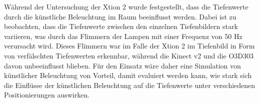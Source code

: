\documentclass[thesis.tex]{subfiles}
\begin{document}
Während der Untersuchung der Xtion 2 wurde festgestellt, dass die Tiefenwerte durch die künstliche Beleuchtung im Raum beeinflusst werden. Dabei ist zu beobachten, dass die Tiefenwerte zwischen den einzelnen Tiefenbildern stark variieren, was durch das Flimmern der Lampen mit einer Frequenz von 50 Hz verursacht wird. Dieses Flimmern war im Falle der Xtion 2 im Tiefenbild in Form von verfälschten Tiefenwerten erkennbar, während die Kinect v2 und die O3D303 davon unbeeinflusst blieben. Für den Einsatz wäre daher eine Simulation von künstlicher Beleuchtung von Vorteil, damit evaluiert werden kann, wie stark sich die Einflüsse der künstlichen Beleuchtung auf die Tiefenwerte unter verschiedenen Positionierungen auswirken.

\subfilebib %
\end{document}
